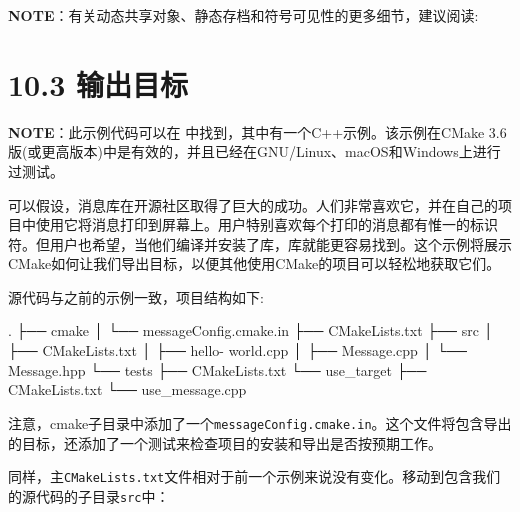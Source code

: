 \begin{myInfoBox}
\textbf{NOTE}：有关动态共享对象、静态存档和符号可见性的更多细节，建议阅读:
\end{myInfoBox}


\section{10.3 输出目标}

\begin{myInfoBox}
\textbf{NOTE}：此示例代码可以在  中找到，其中有一个C++示例。该示例在CMake 3.6版(或更高版本)中是有效的，并且已经在GNU/Linux、macOS和Windows上进行过测试。
\end{myInfoBox}

可以假设，消息库在开源社区取得了巨大的成功。人们非常喜欢它，并在自己的项目中使用它将消息打印到屏幕上。用户特别喜欢每个打印的消息都有惟一的标识符。但用户也希望，当他们编译并安装了库，库就能更容易找到。这个示例将展示CMake如何让我们导出目标，以便其他使用CMake的项目可以轻松地获取它们。


源代码与之前的示例一致，项目结构如下:

\begin{codebox}[shell]
.
├── cmake
│    └── messageConfig.cmake.in
├── CMakeLists.txt
├── src
│    ├── CMakeLists.txt
│    ├── hello- world.cpp
│    ├── Message.cpp
│    └── Message.hpp
└── tests
    ├── CMakeLists.txt
    └── use_target
        ├── CMakeLists.txt
        └── use_message.cpp
\end{codebox}

注意，cmake子目录中添加了一个\texttt{messageConfig.cmake.in}。这个文件将包含导出的目标，还添加了一个测试来检查项目的安装和导出是否按预期工作。


同样，主\texttt{CMakeLists.txt}文件相对于前一个示例来说没有变化。移动到包含我们的源代码的子目录\texttt{src}中：

